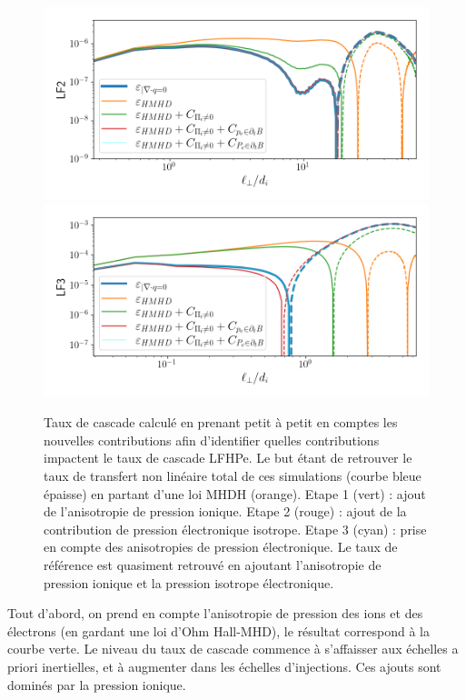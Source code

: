 \begin{figure}[!ht]
 \centering
\includegraphics[width=1\linewidth,trim=1cm 1cm 0cm 1cm, clip=true]{./Part_3/images_ch4/LF2_detail}
\includegraphics[width=1\linewidth,trim=1cm 1cm 0cm 1cm, clip=true]{./Part_3/images_ch4/LF3_detail}
\cprotect\caption{Taux de cascade calculé en prenant petit à petit en comptes les nouvelles contributions afin d'identifier quelles contributions impactent le taux de cascade \acs{LFHPe}. Le but étant de retrouver le taux de transfert  non linéaire total de ces simulations (courbe bleue épaisse) en partant d'une loi \acs{MHDH} (orange). Etape 1 (vert) : ajout de l'anisotropie de pression ionique. Etape 2 (rouge) : ajout de la contribution de pression électronique isotrope. Etape 3 (cyan) : prise en compte des anisotropies de pression électronique. Le taux de référence est quasiment retrouvé en ajoutant l'anisotropie de pression ionique et la pression isotrope électronique.}
\label{fig:LF_detail}
\end{figure} 
 Tout d'abord, on prend en compte l'anisotropie de pression des ions et des électrons (en gardant une loi d'Ohm Hall-MHD), le résultat correspond à la courbe verte. Le niveau du taux de cascade commence à s'affaisser aux échelles a priori inertielles, et à augmenter dans les échelles d'injections. Ces ajouts sont dominés par la pression ionique.


